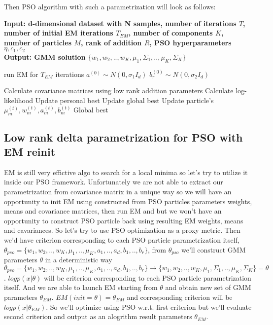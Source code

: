 \documentclass[a4paper]{article}
\begin{document}
 Then PSO algorithm with such a parametrization will look as follows:
 \begin{algorithm}
    \caption{}\label{alg:cap}
    \hspace*{\algorithmicindent} \textbf{Input: d-dimensional dataset with N samples, number of iterations $T$, number of initial EM iterations $T_{EM}$, 
    number of components $K$, number of particles $M$, rank of addition $R$,
    PSO hyperparameters $\eta, c_1, c_2$} \\
    \hspace*{\algorithmicindent} \textbf{Output: GMM solution $\{w_1, w_2, .., w_K, \mu_1, \Sigma_1, .., \mu_K, \Sigma_K\}$} 
    \begin{algorithmic}
    \State run EM for $T_{EM}$ iterations
        \State $a^{(0)}\sim N(0, \sigma_1I_d)$ 
            \State $b^{(0)}_r \sim N(0, \sigma_2 I_d)$
        \EndFor
    \EndFor
    
            \State Calculate covariance matrices using low rank addition parameters
            \State Calculate log-likelihood
            \State Update personal best
         \EndFor
         \State Update global best
            \State Update particle's $\mu_m^{(t)}, w_m^{(t)}, a_m^{(t)}, b_m^{(t)}$
         \EndFor
     \EndFor
     \State \Return Global best
     \end{algorithmic}
     \end{algorithm}

\subsection{Low rank delta parametrization for PSO with EM reinit}

    EM is still very effictive algo to search for a local minima so let's try to utilize it inside our PSO framework. 
Unfortunately we are not able to extract our parametrization from covariance matrix in a unique way so we will have an 
opportunity to init EM using constructed from PSO particles parameters weights, means and covariance matrices, then run EM 
and but we won't have an opportunity to construct PSO particle back using resulting EM weights, means and cavariances. So let's try to use PSO optimization as a proxy metric.
Then we'd have criterion corresponding to each PSO particle parametrization itself,
$\theta_{pso} = \{w_1, w_2, .., w_K, \mu_1, .., \mu_K, a_1, .., a_d, b_1, .., b_r\}$, from $\theta_{pso}$  we'll construct GMM parameters $\theta$ in a deterministic way
$\theta_{pso} = \{w_1, w_2, .., w_K, \mu_1, .., \mu_K, a_1, .., a_d, b_1, .., b_r\} \rightarrow \{w_1, w_2, .., w_K, \mu_1, \Sigma_1, .., \mu_K, \Sigma_K\} = \theta$. 
$log p(x | \theta)$ will be criterion corresponding to each PSO particle parametrization itself. And we are able to launch EM starting from 
$\theta$ and obtain new set of GMM parameters $\theta_{EM}$. $EM(init=\theta) = \theta_{EM}$ and corresponding criterion will be $logp(x |\theta_{EM})$.
So we'll optimize using PSO w.r.t. first criterion but we'll evaluate second criterion and output as an alogrithm result parameters $\theta_{EM}$.
\end{document}

